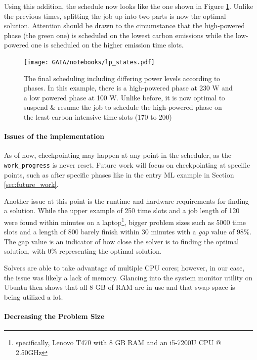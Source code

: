 Using this addition, the schedule now looks like the one shown in Figure \ref{fig:lp_states}. 
Unlike the previous times, splitting the job up into two parts is now the optimal solution. 
Attention should be drawn to the circumstance that the high-powered phase (the green one) is scheduled on the lowest carbon emissions while the low-powered one is scheduled on the higher emission time slots.

\begin{figure}
    \texttt{[image: GAIA/notebooks/lp\_states.pdf]}
    \caption{The final scheduling including differing power levels according to phases. In this example, there is a high-powered phase at 230 W and a low powered phase at 100 W. Unlike before, it is now optimal to suspend \& resume the job to schedule the high-powered phase on the least carbon intensive time slots (170 to 200)}
    \label{fig:lp_states}
\end{figure}

\paragraph{Issues of the implementation}

As of now, checkpointing may happen at any point in the scheduler, as the \verb|work_progress| is never reset. 
Future work will focus on checkpointing at specific points, such as after specific phases like in the entry ML example in Section \ref{sec:future_work}.

Another issue at this point is the runtime and hardware requirements for finding a solution.
While the upper example of 250 time slots and a job length of 120 were found within minutes on a laptop\footnote{specifically, Lenovo T470 with 8 GB RAM and an i5-7200U CPU @ 2.50GHz}, bigger problem sizes such as 5000 time slots and a length of 800 barely finish within 30 minutes with a \emph{gap} value of 98\%.
The gap value is an indicator of how close the solver is to finding the optimal solution, with 0\% representing the optimal solution.

Solvers are able to take advantage of multiple CPU cores; however, in our case, the issue was likely a lack of memory. 
Glancing into the system monitor utility on Ubuntu then shows that all 8 GB of RAM are in use and that swap space is being utilized a lot.

\paragraph{Decreasing the Problem Size}

